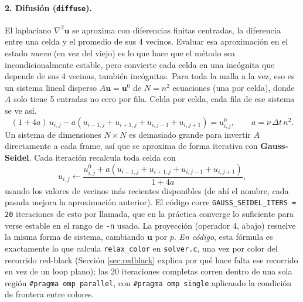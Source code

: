 \documentclass[11pt]{article}
\begin{document}
\paragraph{2. Difusión (\texttt{diffuse}).} El laplaciano $\nabla^2
\mathbf{u}$ se aproxima con diferencias finitas centradas, la diferencia
entre una celda y el promedio de sus 4 vecinos. Evaluar esa aproximación
en el estado \emph{nuevo} (en vez del viejo) es lo que hace que el
método sea incondicionalmente estable, pero convierte cada celda en una
incógnita que depende de sus 4 vecinas, también incógnitas. Para toda la
malla a la vez, eso es un sistema lineal disperso $A \mathbf{u} =
\mathbf{u}^0$ de $N = n^2$ ecuaciones (una por celda), donde $A$ solo
tiene 5 entradas no cero por fila. Celda por celda, cada fila de ese
sistema se ve así.
\[
(1 + 4a) \, u_{i,j} - a \left( u_{i-1,j} + u_{i+1,j} + u_{i,j-1} + u_{i,j+1} \right) = u^0_{i,j}, \qquad a = \nu \, \Delta t \, n^2.
\]
Un sistema de dimensiones $N \times N$ es demasiado grande para invertir
$A$ directamente a cada frame, así que se aproxima de forma iterativa con
\textbf{Gauss-Seidel}. Cada iteración recalcula toda celda con
\[
u_{i,j} \leftarrow \frac{u^0_{i,j} + a \left( u_{i-1,j} + u_{i+1,j} + u_{i,j-1} + u_{i,j+1} \right)}{1 + 4a},
\]
usando los valores de vecinos más recientes disponibles (de ahí el
nombre, cada pasada mejora la aproximación anterior). El código corre
\texttt{GAUSS\_SEIDEL\_ITERS = 20} iteraciones de esto por llamada, que
en la práctica converge lo suficiente para verse estable en el rango de
\texttt{-n} usado. La proyección (operador 4, abajo) resuelve la misma
forma de sistema, cambiando $\mathbf{u}$ por $p$. \emph{En código}, esta
fórmula es exactamente lo que calcula \texttt{relax\_color} en
\texttt{solver.c}, una vez por color del recorrido red-black (Sección
\ref{sec:redblack} explica por qué hace falta ese recorrido en vez de
un loop plano); las 20 iteraciones completas corren dentro de una sola
región \texttt{\#pragma omp parallel}, con
\texttt{\#pragma omp single} aplicando la condición de frontera entre
colores.
\end{document}
